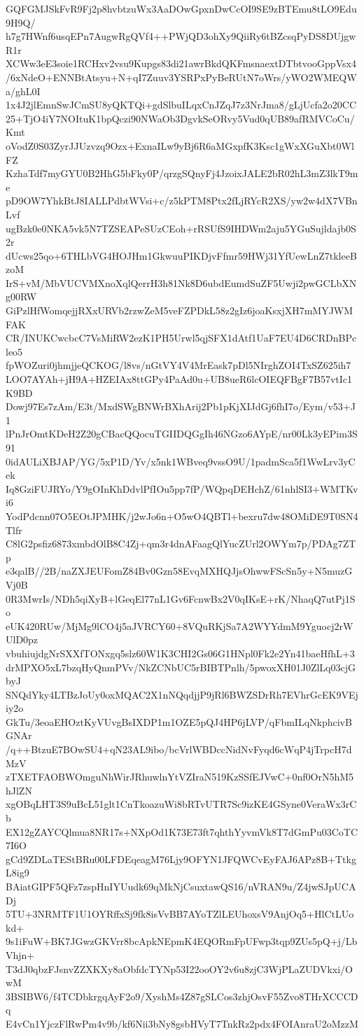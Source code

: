 GQFGMJSkFvR9Fj2p8hvbtzuWx3AaDOwGpxnDwCcOI9SE9zBTEmu8tLO9Edu9H9Q/
h7g7HWnf6usqEPn7AugwRgQVf4++PWjQD3ohXy9QiiRy6tBZcsqPyDS8DUjgwR1r
XCWw3eE3soie1RCHxv2vsu9Kupgs83di21awrBkdQKFmsnaextDTbtvooGppVsx4
/6xNdeO+ENNBtAtsyu+N+qI7Zuuv3YSRPxPyBeRUtN7oWrs/yWO2WMEQWa/ghL0I
1x4J2jlEmnSwJCmSU8yQKTQi+gdSlbuILqxCnJZqJ7z3NrJma8/gLjUcfa2o20CC
25+TjO4iY7NOItuK1bpQczi90NWaOb3DgvkSeORvy5Vud0qUB89afRMVCoCu/Kmt
oVodZ0S03ZyrJJUzvzq9Ozx+ExnaILw9yBj6R6aMGxpfK3Ksc1gWxXGuXbt0WlFZ
KzhaTdf7myGYU0B2HhG5bFky0P/qrzgSQnyFj4JzoixJALE2bR02hL3mZ3lkT9me
pD9OW7YhkBtJ8IALLPdbtWVsi+c/z5kPTM8Ptx2fLjRYcR2XS/yw2w4dX7VBnLvf
ugBzk0e0NKA5vk5N7TZSEAPeSUzCEoh+rRSUfS9IHDWm2aju5YGuSujldajb0S2r
dUcws25qo+6THLbVG4HOJHm1GkwuuPIKDjvFfmr59HWj31YfUewLnZ7tkleeBzoM
IrS+vM/MbVUCVMXnoXqlQerrH3h81Nk8D6ubdEumdSuZF5Uwji2pwGCLbXNg00RW
GiPzlHfWomqejjRXxURVb2rzwZeM5veFZPDkL58z2gIz6joaKsxjXH7mMYJWMFAK
CR/INUKCwcbcC7VsMiRW2ezK1PH5Urwl5qjSFX1dAtf1UaF7EU4D6CRDnBPcleo5
fpWOZuri0jhmjjeQCKOG/l8vs/nGtVY4V4MrEask7pDl5NIrghZOI4TxSZ625ih7
LOO7AYAh+jH9A+HZEIAx8ttGPy4PaAd0u+UB8ueR6lcOIEQFBgF7B57vtIc1K9BD
Dowj97Es7zAm/E3t/MxdSWgBNWrBXhArij2Pb1pKjXIJdGj6fhI7o/Eym/v53+J1
lPnJrOmtKDeH2Z20gCBacQQocuTGIIDQGgIh46NGzo6AYpE/nr00Lk3yEPim3S91
0idAULiXBJAP/YG/5xP1D/Yv/x5nk1WBveq9vssO9U/1padmSca5f1WwLrv3yCek
Iq8GziFUJRYo/Y9gOInKhDdvlPfIOu5pp7fP/WQpqDEHchZ/61nhlSI3+WMTKvi6
YodPdcnn07O5EOtJPMHK/j2wJo6n+O5wO4QBTl+bexru7dw48OMiDE9T0SN4Tlfr
C8lG2psfiz6873xmbdOlB8C4Zj+qm3r4dnAFaagQlYucZUrl2OWYm7p/PDAg7ZTp
e3qalB//2B/naZXJEUFomZ84Bv0Gzn58EvqMXHQJjsOhwwFScSn5y+N5muzGVj0B
0R3MwrIs/NDh5qiXyB+lGeqEl77nL1Gv6FcnwBx2V0qIKsE+rK/NhaqQ7utPj1So
eUK420RUw/MjMg9lCO4j5aJVRCY60+8VQuRKjSa7A2WYYdmM9Yguocj2rWUlD0pz
vbuhiujdgNrSXXfTONxgq5slz60W1K3CHI2Gs06G1HNpl0Fk2e2Yn41baeHfhL+3
drMPXO5xL7bzqHyQnmPVv/NkZCNbUC5rBIBTPnlh/5pwoxXH01J0ZlLq03cjGbyJ
SNQdYky4LTBzJoUy0oxMQAC2X1nNQqdjjP9jRl6BWZSDrRh7EVhrGcEK9VEjiy2o
GkTu/3eoaEHOztKyVUvgBsIXDP1m1OZE5pQJ4HP6jLVP/qFbmILqNkphcivBGNAr
/q++BtzuE7BOwSU4+qN23AL9ibo/bcVrlWBDccNidNvFyqd6cWqP4jTrpcH7dMzV
zTXETFAOBWOmguNhWirJRhuwlnYtVZIraN519KzSSfEJVwC+0nf0OrN5hM5hJlZN
xgOBqLHT3S9uBcL51glt1CnTkoazuWi8bRTvUTR7Sc9izKE4GSyne0VeraWx3rCb
EX12gZAYCQlmua8NR17s+NXpOd1K73E73ft7qhthYyvmVk8T7dGmPu03CoTC7I6O
gCd9ZDLaTEStBRu00LFDEqeagM76Ljy9OFYN1JFQWCvEyFAJ6APz8B+TtkgL8ig9
BAiatGIPF5QFz7zspHnIYUudk69qMkNjCsuxtawQS16/nVRAN9u/Z4jwSJpUCADj
5TU+3NRMTF1U1OYRffxSj9fk8isVvBB7AYoTZlLEUhoxsV9AnjOq5+HlCtLUokd+
9s1iFuW+BK7JGwzGKVrr8bcApkNEpmK4EQORmFpUFwp3tqp9ZUs5pQ+j/LbVhjn+
T3dJ0qbzFJsnvZZXKXy8aObfdcTYNp53I22ooOY2v6u8zjC3WjPLaZUDVkxi/OwM
3BSIBW6/f4TCDbkrgqAyF2o9/XyshMs4Z87gSLCos3zhjOsvF55Zvo8THrXCCCDq
E4vCn1YjczFlRwPm4v9b/kf6Nii3bNy8gsbHVyT7TnkRz2pdx4FOIAnraU2oMzzM
